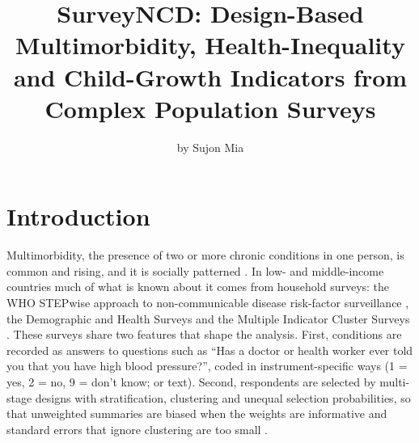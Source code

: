 \title{SurveyNCD: Design-Based Multimorbidity, Health-Inequality and Child-Growth Indicators from Complex Population Surveys}
\author{by Sujon Mia}

\maketitle


\section{Introduction}

Multimorbidity, the presence of two or more chronic conditions in one person, is common and rising, and it is socially patterned \citep{barnett2012, afshar2015}. In low- and middle-income countries much of what is known about it comes from household surveys: the WHO STEPwise approach to non-communicable disease risk-factor surveillance \citep[STEPS;][]{riley2016}, the Demographic and Health Surveys \citep[DHS;][]{corsi2012} and the Multiple Indicator Cluster Surveys \citep[MICS;][]{khan2019}. These surveys share two features that shape the analysis. First, conditions are recorded as answers to questions such as ``Has a doctor or health worker ever told you that you have high blood pressure?'', coded in instrument-specific ways (1 = yes, 2 = no, 9 = don't know; or text). Second, respondents are selected by multi-stage designs with stratification, clustering and unequal selection probabilities, so that unweighted summaries are biased when the weights are informative and standard errors that ignore clustering are too small \citep{lumley2010}.

